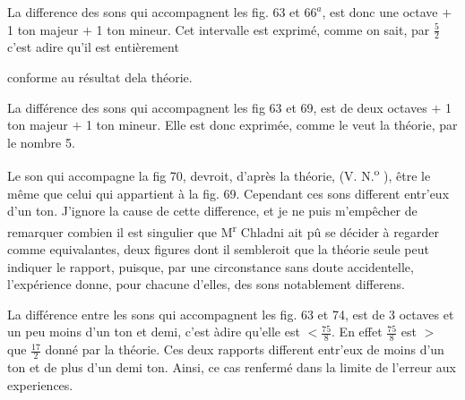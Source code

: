 \documentclass[11pt,a4paper]{article}
\begin{document}
La difference des sons qui accompagnent les fig. 63 et $66^{a}$, est donc
une octave $+$ 1 ton majeur $+$ 1 ton mineur. Cet intervalle est exprimé,
comme on sait, par $\frac{5}{2}$ c'est adire qu'il est entièrement


conforme au résultat dela théorie.

La différence des sons qui accompagnent les fig 63 et 69, est
de deux octaves $+$ 1 ton majeur $+$ 1 ton mineur. Elle est donc
exprimée, comme le veut la théorie, par le nombre 5.

Le son qui accompagne la fig 70, devroit, d'après la théorie,
(V. N.\textsuperscript{o} ), être le même que celui qui appartient à la fig. 69. Cependant
 ces sons different entr'eux  d'un ton. J'ignore la cause
de cette difference, et je ne puis m'empêcher de remarquer combien
il est singulier que M\textsuperscript{r} Chladni ait pû se décider à
regarder  comme equivalantes, deux figures
dont il sembleroit que la théorie seule peut indiquer le rapport,
puisque, par une circonstance sans doute accidentelle,
l'expérience donne, pour chacune d'elles, des sons notablement
differens.

La différence entre les sons qui accompagnent les fig. 63 et 74,
est de 3 octaves et un peu moins d'un ton et demi, c'est àdire
qu'elle est $< \frac{75}{8}$.  En effet $\frac{75}{8}$ est $>$ que $\frac{17}{2}$ donné par la 
théorie.  Ces deux rapports different entr'eux de moins
d'un ton et de plus d'un demi ton. Ainsi,  ce cas  renfermé 
dans la limite de l'erreur   aux experiences.
\end{document}
